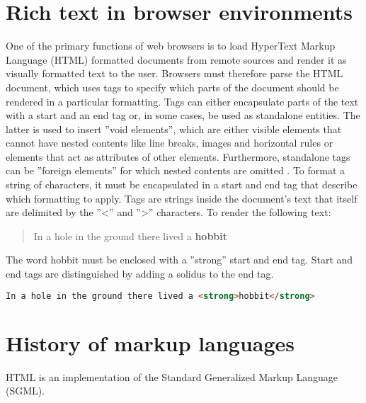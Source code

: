 \section{Rich text in browser environments}

One of the primary functions of web browsers is to load HyperText Markup Language (HTML) formatted documents from remote sources and render it as visually formatted text to the user. Browsers must therefore parse the HTML document, which uses tags to specify which parts of the document should be rendered in a particular formatting. Tags can either encapsulate parts of the text with a start and an end tag or, in some cases, be used as standalone entities. 
The latter is used to insert ''void elements'', which are either visible elements that cannot have nested contents like line breaks, images and horizontal rules or elements that act as attributes of other elements. Furthermore, standalone tags can be ''foreign elements'' for which nested contents are omitted \cite[Elements]{HTML5}. 
To format a string of characters, it must be encapsulated in a start and end tag that describe which formatting to apply. Tags are strings inside the document's text that itself are delimited by the ''<'' and ''>'' characters. To render the following text: 

\begin{quotation}
In a hole in the ground there lived a \textbf{hobbit}
\end{quotation}

The word hobbit must be enclosed with a ''strong'' start and end tag. Start and end tags are distinguished by adding a solidus to the end tag.

\begin{lstlisting}[language=html, caption=Text formatted as bold, label=lst:div-contenteditable]
In a hole in the ground there lived a <strong>hobbit</strong>
\end{lstlisting}



\section{History of markup languages}

HTML is an implementation of the Standard Generalized Markup Language (SGML).